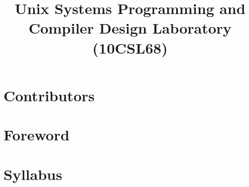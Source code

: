 \documentclass{report}
\begin{document}
\title{Unix Systems Programming and \\ Compiler Design Laboratory \\ (10CSL68)}
\maketitle

\chapter*{Contributors}


\chapter*{Foreword}


\chapter*{Syllabus}


\tableofcontents


\end{document}
